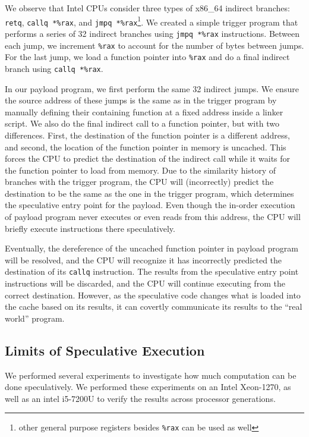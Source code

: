 We observe that Intel CPUs consider three types of x86\_64 indirect branches:
\texttt{retq}, \texttt{callq *\%rax}, and \texttt{jmpq *\%rax}\footnote{other
general purpose registers besides \texttt{\%rax} can be used as well}.
We created a simple trigger program that performs a series of 32 indirect
branches
using \texttt{jmpq *\%rax} instructions. Between each jump, we increment
\texttt{\%rax} to account for the number of bytes between jumps. For the last
jump, we load a function pointer into \texttt{\%rax} and do a final indirect
branch using \texttt{callq *\%rax}.

In our payload program, we first perform the same 32 indirect jumps. We ensure
the source address of these jumps is the same as in the trigger program by
manually defining their containing function at a fixed address inside a linker
script. We also do the final indirect call to a function pointer, but with two
differences. First, the destination of the function pointer is a different
address, and second, the location of the function pointer in memory is uncached.
This forces the CPU to predict the destination of the indirect call while it
waits for the function pointer to load from memory. Due to the similarity
history of branches with the trigger program,
the CPU will (incorrectly) predict the destination to be the same as the one in
the trigger program, which determines the speculative entry point for the
payload. Even though the in-order execution of
payload program never executes or even reads from this address, the CPU will
briefly execute instructions there speculatively.

Eventually, the dereference of the uncached function pointer in payload program
will be resolved, and the CPU will recognize it has incorrectly predicted the
destination of its \texttt{callq} instruction. The results from the speculative
entry point instructions will be discarded, and the CPU will continue executing
from the correct destination. However, as the speculative code changes what is
loaded into the cache based on its results, it can covertly communicate its
results to the ``real world'' program.



\subsection{Limits of Speculative Execution}

\FigSpecMeasure

We performed several experiments to investigate how much computation can be done
speculatively. We performed these experiments on an Intel Xeon-1270, as well as 
an intel i5-7200U to verify the results across processor generations. 

